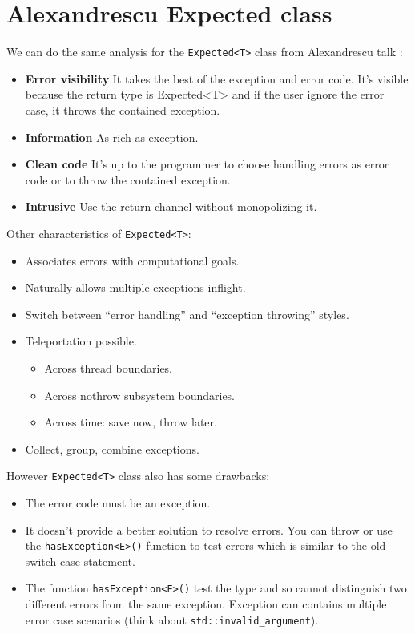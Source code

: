 \documentclass[a4paper,10pt]{article}
\newcommand{\cpp}[1]{\lstinline{#1}}
\begin{document}
\section{Alexandrescu Expected class}

We can do the same analysis for the \cpp{Expected<T>} class from Alexandrescu talk \cite{AlexandrescuExpected}:

\begin{itemize}
 \item \textbf{Error visibility} It takes the best of the exception and error code. It's visible because the return type is Expected<T> and if the user ignore the error case, it throws the contained exception.
 \item \textbf{Information} As rich as exception.
 \item \textbf{Clean code} It's up to the programmer to choose handling errors as error code or to throw the contained exception.
 \item \textbf{Intrusive} Use the return channel without monopolizing it.
\end{itemize}

\noindent
Other characteristics of \cpp{Expected<T>}:

\begin{itemize}
 \item Associates errors with computational goals.
 \item Naturally allows multiple exceptions inflight.
 \item Switch between ``error handling'' and ``exception throwing'' styles.
 \item Teleportation possible.
 \begin{itemize}
  \item Across thread boundaries.
  \item Across nothrow subsystem boundaries.
  \item Across time: save now, throw later.
 \end{itemize}
 \item Collect, group, combine exceptions.
\end{itemize}

\noindent
However \cpp{Expected<T>} class also has some drawbacks:
\begin{itemize}
 \item The error code must be an exception.
 \item It doesn't provide a better solution to resolve errors. You can throw or use the \cpp{hasException<E>()} function to test errors which is similar to the old switch case statement.
 \item The function \cpp{hasException<E>()} test the type and so cannot distinguish two different errors from the same exception. Exception can contains multiple error case scenarios (think about \cpp{std::invalid_argument}).
\end{itemize}
\end{document}

